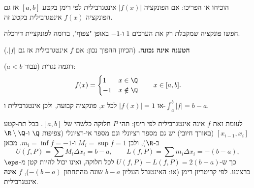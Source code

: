 
\begin{question}
הוכיחו או הפריכו: אם הפונקציה $|f(x)|$ אינטגרבילית לפי רימן בקטע $[a,b]$ אז גם הפונקציה $f(x)$ אינטגרבילית בקטע זה.
\end{question}

\begin{hint}
חפשו פונקציה שמקבלת רק את הערכים $1$ ו-$-1$ באופן "צפוף", בדומה לפונקציית דירכלה.
\end{hint}

\begin{solution}
\textbf{הטענה אינה נכונה.} (הכיוון ההפוך נכון: אם $f$ אינטגרבילית אז גם $|f|$.)

דוגמה נגדית (עבור $a<b$):
\[ f(x)=\begin{cases}1 & x\in\Q\\ -1 & x\notin\Q\end{cases}\qquad x\in[a,b]. \]
אז $|f(x)|=1$ לכל $x$, פונקציה קבועה, ולכן אינטגרבילית ו-$\int_a^b|f|=b-a$.

לעומת זאת $f$ אינה אינטגרבילית לפי רימן: תהי $P$ חלוקה כלשהי של $[a,b]$. בכל תת-קטע $[x_{i-1},x_i]$ (באורך חיובי) יש גם מספר רציונלי וגם מספר אי-רציונלי (צפיפות $\Q$ ו-$\R\setminus\Q$ ב-$\R$), ולכן $M_i=\sup f=1$ ו-$m_i=\inf f=-1$. מכאן
\[ U(f,P)=\sum M_i\Delta x_i=b-a,\qquad L(f,P)=\sum m_i\Delta x_i=-(b-a), \]
כך ש-$U(f,P)-L(f,P)=2(b-a)$ לכל חלוקה, ואינו יכול להיות קטן מ-$\eps$ כרצוננו. לפי קריטריון רימן (או: האינטגרל העליון $b-a$ שונה מהתחתון $-(b-a)$), $f$ \textbf{אינה} אינטגרבילית.
\end{solution}
